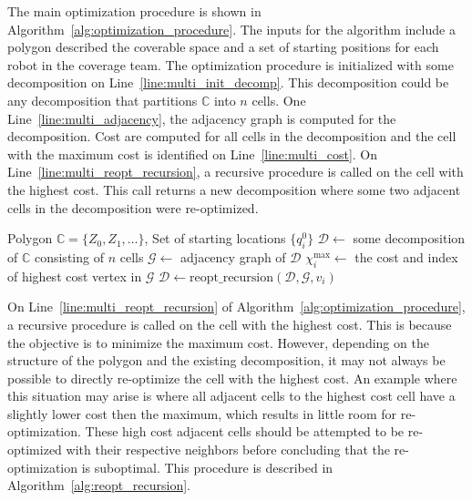 \documentclass[../main.tex]{subfiles}
\begin{document}
The main optimization procedure is shown in Algorithm~\ref{alg:optimization_procedure}. The inputs for the algorithm include a polygon described the coverable space and a set of starting positions for each robot in the coverage team. The optimization procedure is initialized with some decomposition on Line~\ref{line:multi_init_decomp}. This decomposition could be any decomposition that partitions $\mathbb{C}$ into $n$ cells. One Line~\ref{line:multi_adjacency}, the adjacency graph is computed for the decomposition. Cost are computed for all cells in the decomposition and the cell with the maximum cost is identified on Line~\ref{line:multi_cost}. On Line~\ref{line:multi_reopt_recursion}, a recursive procedure is called on the cell with the highest cost. This call returns a new decomposition where some two adjacent cells in the decomposition were re-optimized.

\begin{algorithm}
	\caption{$\text{optimization\_procedure}(\mathbb{C}, \{q^0_i\})$}
	\label{alg:optimization_procedure}
	\begin{algorithmic}[1]
		\REQUIRE Polygon $\mathbb{C}=\{Z_0,Z_1,\ldots\}$, Set of starting locations $\{q^0_i\}$
			\STATE $\mathcal{D}\gets$ some decomposition of $\mathbb{C}$ consisting of $n$ cells \label{line:multi_init_decomp}
			\REPEAT
			\STATE $\mathcal{G}\gets$ adjacency graph of $\mathcal{D}$ \label{line:multi_adjacency}
			\STATE $\chi^{\max}_i\gets$ the cost and index of highest cost vertex in $\mathcal{G}$ \label{line:multi_cost}
			\STATE $\mathcal{D}\gets\text{reopt\_recursion}(\mathcal{D},\mathcal{G}, v_i)$ \label{line:multi_reopt_recursion}
	\end{algorithmic}
\end{algorithm}

On Line~\ref{line:multi_reopt_recursion} of Algorithm~\ref{alg:optimization_procedure}, a recursive procedure is called on the cell with the highest cost. This is because the objective is to minimize the maximum cost. However, depending on the structure of the polygon and the existing decomposition, it may not always be possible to directly re-optimize the cell with the highest cost. An example where this situation may arise is where all adjacent cells to the highest cost cell have a slightly lower cost then the maximum, which results in little room for re-optimization. These high cost adjacent cells should be attempted to be re-optimized with their respective neighbors before concluding that the re-optimization is suboptimal. This procedure is described in Algorithm~\ref{alg:reopt_recursion}.
\end{document}
